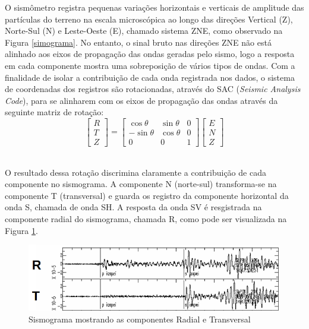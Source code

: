 O sismômetro registra pequenas variações horizontais e verticais de amplitude das partículas do terreno na escala microscópica ao longo das direções Vertical (Z), Norte-Sul (N) e Leste-Oeste (E), chamado sistema ZNE, como observado na Figura \ref{simograma}. No entanto, o sinal bruto nas direções ZNE não está alinhado aos eixos de propagação das ondas geradas pelo sismo, logo a resposta em cada componente mostra uma sobreposição de vários tipos de ondas. Com a finalidade de isolar a contribuição de cada onda registrada nos dados, o sistema de coordenadas dos registros são rotacionadas, através do SAC (\textit{Seismic Analysis Code}), para se alinharem com os eixos de propagação das ondas através da seguinte matriz de rotação:
\
\[
\left[ \begin{array}{c} R \\ T \\ Z \end{array} \right] = \begin{bmatrix} \cos \theta & \sin \theta & 0 \\ - \sin \theta & \cos \theta & 0 \\ 0 & 0 & 1 \end{bmatrix} \left[ \begin{array}{c} E \\ N \\ Z \end{array} \right]
\]
\

O resultado dessa rotação discrimina claramente a contribuição de cada componente  no sismograma. A componente N (norte-sul) transforma-se na componente T (transversal) e guarda os registro da componente horizontal da onda S, chamada de onda SH. A resposta da onda SV é resgistrada na componente radial do sismograma, chamada R, como pode ser visualizada na Figura \ref{sismo_radial}.   

\begin{figure}[!ht]
\centering
\includegraphics[scale=0.6]{Componente_Radial_Transversal.png}
\caption{Sismograma mostrando as componentes Radial e Transversal}
\label{sismo_radial}
\end{figure}

